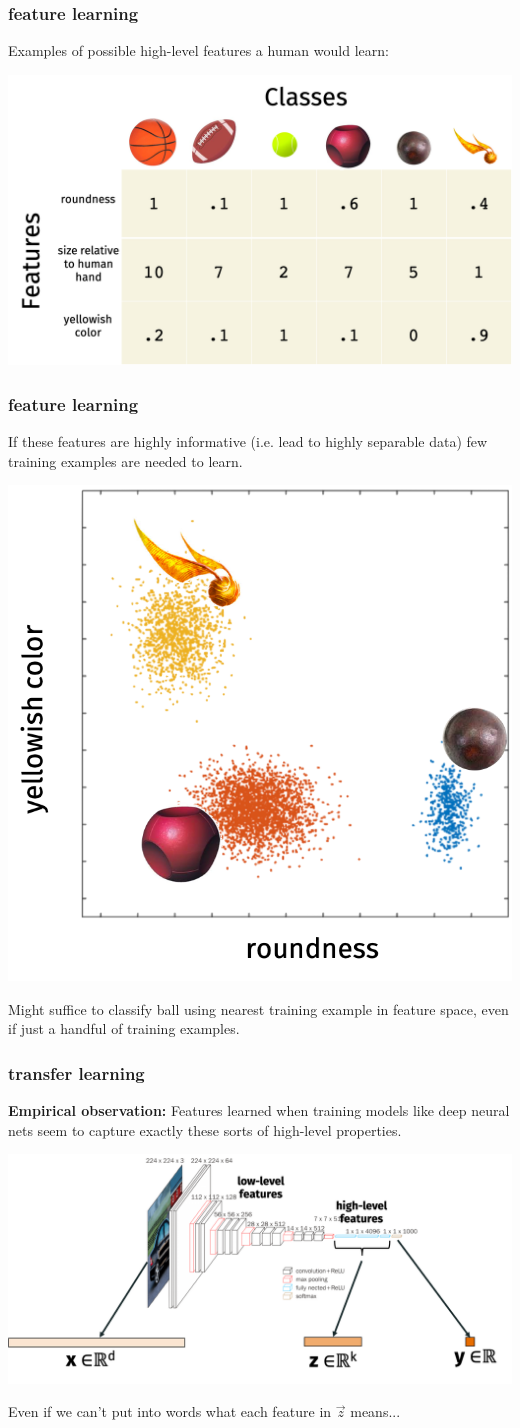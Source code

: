 \documentclass[handout,compress]{beamer}
\begin{document}
\begin{frame}
	\frametitle{feature learning}
	Examples of possible high-level features a human would learn:

		\includegraphics[width=.8\textwidth]{highlevel_features.png}
\end{frame}

\begin{frame}
	\frametitle{feature learning}
	If these features are highly informative (i.e. lead to highly separable data) few training examples are needed to learn.
	\begin{center}
		\includegraphics[width=.4\textwidth]{very_sep.png}
	\end{center}
Might suffice to classify ball using nearest training example in feature space, even if just a handful of training examples.
\end{frame}

\begin{frame}
	\frametitle{transfer learning}
	\textbf{Empirical observation:} Features learned when training models like deep neural nets seem to capture exactly these sorts of high-level properties. 
	\begin{center}
		\includegraphics[width=\textwidth]{transfer_abstract.png}
	\end{center}
	Even if we can't put into words what each feature in $\vec{z}$ means...
\end{frame}
\end{document}
